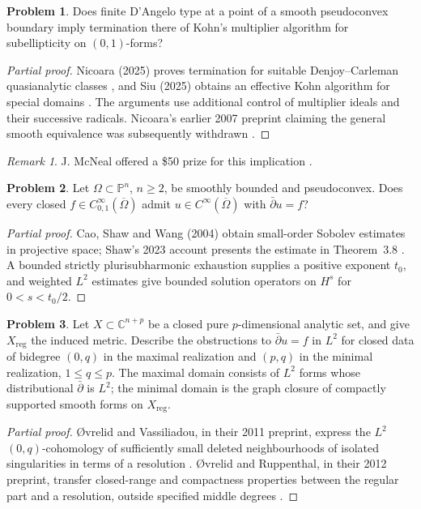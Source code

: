 \documentclass[11pt,reqno]{amsart}
\theoremstyle{definition}
\newtheorem{problem}{Problem}[section]
\theoremstyle{remark}
\newtheorem*{remark}{Remark}
\begin{document}
\begin{problem}\label{b95-14-2}
Does finite D'Angelo type at a point of a smooth pseudoconvex boundary imply termination there of Kohn's multiplier algorithm for subellipticity on $(0,1)$-forms?
\end{problem}
\begin{proof}[Partial proof]
Nicoara (2025) proves termination for suitable Denjoy--Carleman quasianalytic classes \cite{B95-Nicoara}, and Siu (2025) obtains an effective Kohn algorithm for special domains \cite{B95-Siu}. The arguments use additional control of multiplier ideals and their successive radicals. Nicoara's earlier 2007 preprint claiming the general smooth equivalence was subsequently withdrawn \cite{B95-NicoaraWithdrawn}.
\end{proof}
\begin{remark}
J. McNeal offered a \$50 prize for this implication \cite[Prize Problem~2]{B95}.
\end{remark}

\begin{problem}\label{FS-3.2}
Let $\Omega\subset\mathbb P^n$, $n\geq2$, be smoothly bounded and pseudoconvex. Does every closed $f\in C^\infty_{0,1}(\overline\Omega)$ admit $u\in C^\infty(\overline\Omega)$ with $\bar\partial u=f$?
\end{problem}
\begin{proof}[Partial proof]
Cao, Shaw and Wang (2004) obtain small-order Sobolev estimates in projective space; Shaw's 2023 account presents the estimate in Theorem~3.8 \cite[\S3.3]{FS-Shaw}. A bounded strictly plurisubharmonic exhaustion supplies a positive exponent $t_0$, and weighted $L^2$ estimates give bounded solution operators on $H^s$ for $0<s<t_0/2$.
\end{proof}

\begin{problem}\label{FS-3.5}
Let $X\subset\mathbb C^{n+p}$ be a closed pure $p$-dimensional analytic set, and give $X_{\mathrm{reg}}$ the induced metric. Describe the obstructions to $\bar\partial u=f$ in $L^2$ for closed data of bidegree $(0,q)$ in the maximal realization and $(p,q)$ in the minimal realization, $1\leq q\leq p$. The maximal domain consists of $L^2$ forms whose distributional $\bar\partial$ is $L^2$; the minimal domain is the graph closure of compactly supported smooth forms on $X_{\mathrm{reg}}$.
\end{problem}
\begin{proof}[Partial proof]
\O vrelid and Vassiliadou, in their 2011 preprint, express the $L^2$ $(0,q)$-cohomology of sufficiently small deleted neighbourhoods of isolated singularities in terms of a resolution \cite{FS-OR}. \O vrelid and Ruppenthal, in their 2012 preprint, transfer closed-range and compactness properties between the regular part and a resolution, outside specified middle degrees \cite{FS-OR2}.
\end{proof}
\end{document}
